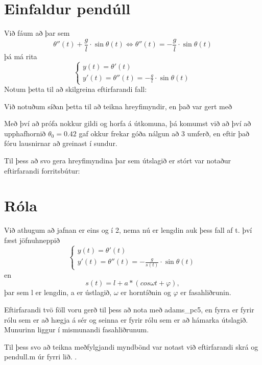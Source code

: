\documentclass[a4]{article}
\begin{document}
\section{Einfaldur pendúll}
Við fáum að þar sem $$\theta''(t) + \frac{g}{l} \cdot \sin{ \theta(t)} \Leftrightarrow \theta''(t) = -\frac{g}{l} \cdot \sin{\theta(t)}$$
  þá má rita $$\left\{ \begin{array}{l} y(t) = \theta'(t) \\ y'(t) = \theta''(t) = - \frac{g}{l} \cdot \sin{\theta(t)} \end{array} \right.$$
Notum þetta til að skilgreina eftirfarandi fall:



Við notuðum síðan þetta til að teikna hreyfimyndir, en það var gert með


Með því að prófa nokkur gildi og horfa á útkomuna, þá komumst við að því að upphafhornið
$\theta_0 = 0.42$ gaf okkur frekar góða nálgun að 3 umferð, en eftir það fóru lausnirnar að greinast í sundur.

Til þess að svo gera hreyfimyndina þar sem útslagið er stórt var notaður eftirfarandi forritsbútur:


\section{Róla}
  Við athugum að jafnan er eins og í 2, nema nú er lengdin auk þess fall af t. því fæst jöfnuhneppið
  $$\left\{ \begin{array}{l} y(t) = \theta'(t) \\ y'(t) = \theta''(t) = - \frac{g}{s(t)} \cdot \sin{\theta(t)} \end{array} \right.$$ 
  en $$s(t) = l + a*(cos \omega t + \varphi),$$
  þar sem l er lengdin, a er ústlagið, $\omega$ er horntíðnin og $\varphi$ er fasahliðrunin.
  
  Eftirfarandi tvö föll voru gerð til þess að nota með adams\_pc5, en fyrra er fyrir rólu sem er að hægja á sér og seinna er fyrir rólu sem er að hámarka útslagið. Munurinn liggur í mismunandi fasahliðrunum.
  
  

  Til þess svo að teikna meðfylgjandi myndbönd var notast við eftirfarandi skrá og pendull.m úr fyrri lið.
  .
  
\end{document}
